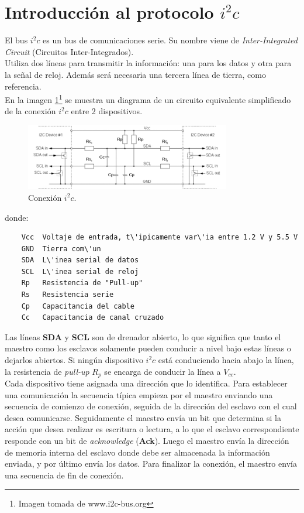 \documentclass[main]{subfiles}
\begin{document}
\newpage
\section{Introducci\'on al protocolo $i^2c$}

El bus $i^2c$ es un bus de comunicaciones serie. Su nombre viene de \emph{Inter-Integrated Circuit} (Circuitos Inter-Integrados).\\
Utiliza dos l\'ineas para transmitir la informaci\'on: una para los datos y otra para la señal de reloj. Adem\'as ser\'a necesaria una tercera l\'inea de tierra, como referencia.\\
En la imagen \ref{fig:setup}\footnote{Imagen tomada de www.i2c-bus.org} se muestra un diagrama de un circuito equivalente simplificado de la conexi\'on $i^2c$ entre 2 dispositivos.

\begin{figure}[h!]
	\centering
	\includegraphics[width=0.8\textwidth]{./pics_sniffer/setup.jpg}
	\caption{Conexi\'on $i^2c$.}
	\label{fig:setup}
\end{figure}
donde:
\begin{verbatim}
	Vcc	 Voltaje de entrada, t\'ipicamente var\'ia entre 1.2 V y 5.5 V
	GND	 Tierra com\'un
	SDA	 L\'inea serial de datos
	SCL	 L\'inea serial de reloj
	Rp 	 Resistencia de "Pull-up"
	Rs 	 Resistencia serie
	Cp 	 Capacitancia del cable
	Cc 	 Capacitancia de canal cruzado
\end{verbatim}

Las l\'ineas \textbf{SDA} y \textbf{SCL} son de drenador abierto, lo que significa que tanto el maestro como los esclavos solamente pueden conducir a nivel bajo estas l\'ineas o dejarlos abiertos. Si ning\'un dispositivo $i^2c$ est\'a conduciendo hacia abajo la l\'inea, la resistencia de \emph{pull-up} $R_p$ se encarga de conducir la l\'inea a $V_{cc}$.\\

Cada dispositivo tiene asignada una direcci\'on que lo identifica. Para establecer una comunicaci\'on la secuencia t\'ipica empieza por el maestro enviando una secuencia de comienzo de conexi\'on, seguida de la direcci\'on del esclavo con el cual desea comunicarse. Seguidamente el maestro env\'ia un bit que determina si la acci\'on que desea realizar es escritura o lectura, a lo que el esclavo correspondiente responde con un bit de \emph{acknowledge} (\textbf{Ack}). Luego el maestro env\'ia la direcci\'on de memoria interna del esclavo donde debe ser almacenada la informaci\'on enviada, y por \'ultimo env\'ia los datos. Para finalizar la conexi\'on, el maestro env\'ia una secuencia de fin de conexi\'on.
\end{document}
